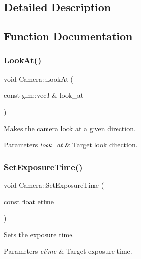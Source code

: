 \subsection{Detailed Description}


\subsection{Function Documentation}
\hypertarget{group___cameras_ga92295d79a45f2ab1756221836567997a}{}\label{group___cameras_ga92295d79a45f2ab1756221836567997a} 
\subsubsection{\texorpdfstring{Look\+At()}{LookAt()}}
{\footnotesize\ttfamily void Camera\+::\+Look\+At (\begin{DoxyParamCaption}\item[{const glm\+::vec3 \&}]{look\+\_\+at }\end{DoxyParamCaption})\hspace{0.3cm}{\ttfamily [inline]}}

Makes the camera look at a given direction. 
\begin{DoxyParams}{Parameters}
{\em look\+\_\+at} & Target look direction. \\
\hline
\end{DoxyParams}
\hypertarget{group___cameras_gaf9985918fc0135ac8c98344c96129509}{}\label{group___cameras_gaf9985918fc0135ac8c98344c96129509} 
\subsubsection{\texorpdfstring{Set\+Exposure\+Time()}{SetExposureTime()}}
{\footnotesize\ttfamily void Camera\+::\+Set\+Exposure\+Time (\begin{DoxyParamCaption}\item[{const float}]{etime }\end{DoxyParamCaption})\hspace{0.3cm}{\ttfamily [inline]}}

Sets the exposure time. 
\begin{DoxyParams}{Parameters}
{\em etime} & Target exposure time. \\
\hline
\end{DoxyParams}
\hypertarget{group___cameras_gad2265245e85699e077dc1d8d33eecece}{}\label{group___cameras_gad2265245e85699e077dc1d8d33eecece} 

